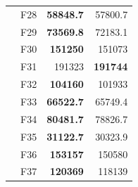\begin{table}[]
\begin{tabular}{ll|r|r|}
\multicolumn{1}{|l|}{\cellcolor[HTML]{ECF4FF}}                           & \cellcolor[HTML]{FCE6AB}F28     & \cellcolor[HTML]{D3FFB6}\textbf{58848.7}                       & 57800.7                                                   \\ \cline{2-4} 
\multicolumn{1}{|l|}{\cellcolor[HTML]{ECF4FF}}                           & \cellcolor[HTML]{FCE6AB}F29     & \cellcolor[HTML]{D3FFB6}\textbf{73569.8}                       & 72183.1                                                   \\ \cline{2-4} 
\multicolumn{1}{|l|}{\cellcolor[HTML]{ECF4FF}}                           & \cellcolor[HTML]{FCE6AB}F30     & \cellcolor[HTML]{D3FFB6}\textbf{151250}                        & 151073                                                    \\ \cline{2-4} 
\multicolumn{1}{|l|}{\cellcolor[HTML]{ECF4FF}}                           & \cellcolor[HTML]{FCE6AB}F31     & 191323                                                         & \cellcolor[HTML]{D3FFB6}\textbf{191744}                   \\ \cline{2-4} 
\multicolumn{1}{|l|}{\cellcolor[HTML]{ECF4FF}}                           & \cellcolor[HTML]{FCE6AB}F32     & \cellcolor[HTML]{D3FFB6}\textbf{104160}                        & 101933                                                    \\ \cline{2-4} 
\multicolumn{1}{|l|}{\cellcolor[HTML]{ECF4FF}}                           & \cellcolor[HTML]{FCE6AB}F33     & \cellcolor[HTML]{D3FFB6}\textbf{66522.7}                       & 65749.4                                                   \\ \cline{2-4} 
\multicolumn{1}{|l|}{\cellcolor[HTML]{ECF4FF}}                           & \cellcolor[HTML]{FCE6AB}F34     & \cellcolor[HTML]{D3FFB6}\textbf{80481.7}                       & 78826.7                                                   \\ \cline{2-4} 
\multicolumn{1}{|l|}{\cellcolor[HTML]{ECF4FF}}                           & \cellcolor[HTML]{FCE6AB}F35     & \cellcolor[HTML]{D3FFB6}\textbf{31122.7}                       & 30323.9                                                   \\ \cline{2-4} 
\multicolumn{1}{|l|}{\cellcolor[HTML]{ECF4FF}}                           & \cellcolor[HTML]{FCE6AB}F36     & \cellcolor[HTML]{D3FFB6}\textbf{153157}                        & 150580                                                    \\ \cline{2-4} 
\multicolumn{1}{|l|}{\cellcolor[HTML]{ECF4FF}}                           & \cellcolor[HTML]{FCE6AB}F37     & \cellcolor[HTML]{D3FFB6}\textbf{120369}                        & 118139                                                    \\ \cline{2-4} 

\end{tabular}
\end{table}
